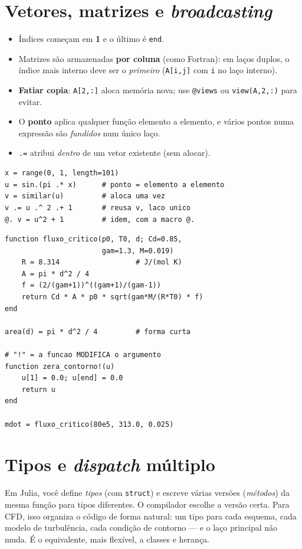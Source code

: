 \documentclass[10pt,a4paper,twocolumn,openany]{report}
\newenvironment{conceito}[1]{\section{#1}}{\par}
\begin{document}
\begin{conceito}{Vetores, matrizes e \emph{broadcasting}}
\begin{itemize}
  \item Índices começam em \textbf{1} e o último é \texttt{end}.
  \item Matrizes são armazenadas \textbf{por coluna} (como Fortran):
        em laços duplos, o índice mais interno deve ser o \emph{primeiro}
        (\texttt{A[i,j]} com \texttt{i} no laço interno).
  \item \textbf{Fatiar copia}: \texttt{A[2,:]} aloca memória nova; use
        \texttt{@views} ou \texttt{view(A,2,:)} para evitar.
  \item O \textbf{ponto} aplica qualquer função elemento a elemento, e
        vários pontos numa expressão são \emph{fundidos} num único laço.
  \item \texttt{.=} atribui \emph{dentro} de um vetor existente (sem alocar).
\end{itemize}
\end{conceito}

\begin{lstlisting}[caption={Broadcasting e operacoes in-place}]
x = range(0, 1, length=101)
u = sin.(pi .* x)      # ponto = elemento a elemento
v = similar(u)         # aloca uma vez
v .= u .^ 2 .+ 1       # reusa v, laco unico
@. v = u^2 + 1         # idem, com a macro @.
\end{lstlisting}

\begin{lstlisting}[caption={Funcoes: forma longa, curta, argumentos nomeados e convencao "!"}]
function fluxo_critico(p0, T0, d; Cd=0.85,
                       gam=1.3, M=0.019)
    R = 8.314                  # J/(mol K)
    A = pi * d^2 / 4
    f = (2/(gam+1))^((gam+1)/(gam-1))
    return Cd * A * p0 * sqrt(gam*M/(R*T0) * f)
end

area(d) = pi * d^2 / 4         # forma curta

# "!" = a funcao MODIFICA o argumento
function zera_contorno!(u)
    u[1] = 0.0; u[end] = 0.0
    return u
end

mdot = fluxo_critico(80e5, 313.0, 0.025)
\end{lstlisting}

\begin{conceito}{Tipos e \emph{dispatch} múltiplo}
Em Julia, você define \emph{tipos} (com \texttt{struct}) e escreve várias
versões (\emph{métodos}) da mesma função para tipos diferentes. O compilador
escolhe a versão certa. Para CFD, isso organiza o código de forma natural:
um tipo para cada esquema, cada modelo de turbulência, cada condição de
contorno --- e o laço principal não muda. É o equivalente, mais flexível, a
classes e herança.
\end{conceito}
\end{document}
